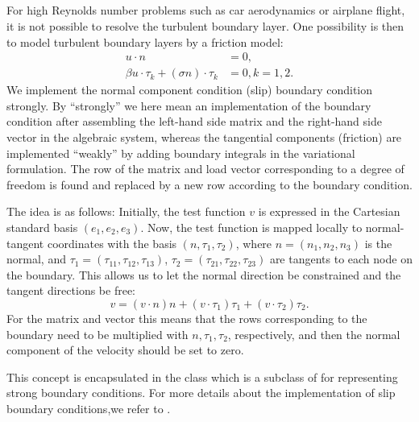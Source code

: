 \subsection{}

For high Reynolds number problems such as car aerodynamics or airplane
flight, it is not possible to resolve the turbulent boundary
layer. One possibility is then to model turbulent boundary layers by a
friction model:
\begin{align}
u \cdot n &= 0,
\\
\beta u \cdot \tau_k + (\sigma n) \cdot \tau_k &= 0, k = 1, 2.
\end{align}
We implement the normal component condition (slip) boundary condition
strongly. By ``strongly'' we here mean an implementation of the
boundary condition after assembling the left-hand side matrix and the
right-hand side vector in the algebraic system, whereas the tangential
components (friction) are implemented ``weakly'' by adding boundary
integrals in the variational formulation. The row of the matrix and
load vector corresponding to a degree of freedom is found and replaced
by a new row according to the boundary condition.

The idea is as follows: Initially, the test function $v$ is expressed
in the Cartesian standard basis $(e_1, e_2, e_3)$.  Now, the test
function is mapped locally to normal-tangent coordinates with the
basis $(n, \tau_1, \tau_2)$, where $n = (n_1, n_2, n_3)$ is the
normal, and $\tau_1 = (\tau_{11}, \tau_{12}, \tau_{13})$, $\tau_2 =
(\tau_{21}, \tau_{22}, \tau_{23})$ are tangents to each node on the
boundary. This allows us to let the normal direction be constrained
and the tangent directions be free:
\begin{equation}
  v = (v \cdot n)n + (v \cdot \tau_1) \tau_1 + (v \cdot \tau_2) \tau_2.
\end{equation}
For the matrix and vector this means that the rows corresponding to the
boundary need to be multiplied with $n,\tau_1,\tau_2$, respectively,
and then the normal component of the velocity should be set to zero.

This concept is encapsulated in the class  which is a
subclass of  for representing strong
boundary conditions. For more details about the implementation of slip
boundary conditions,we refer to \citet{Nazarov2009}.

\subsection{}

